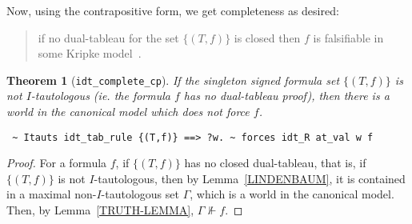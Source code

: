 \documentclass[a4paper]{article}
\newtheorem{theorem}{Theorem}
\newtheorem{definition}{Definition}
\newcommand{\hol}{\texttt{HOL4}}
\begin{document}
Now, using the contrapositive form, we get completeness as desired:
\begin{quote}
  if no dual-tableau for the set $\{(T, f)\}$ is closed then $f$ is
  falsifiable in some Kripke model~\cite{fitting-dual-tableau}.
\end{quote}

\begin{theorem}[\texttt{idt\_complete\_cp}]\label{idt-complete-cp}
  If the singleton signed formula set ${\{ (T, f) \}}$ is not
  $I$-tautologous (ie. the formula $f$ has no dual-tableau proof),
  then there is a world in the canonical model which does not force $f$.
\begin{verbatim}
 ~ Itauts idt_tab_rule {(T,f)} ==> ?w. ~ forces idt_R at_val w f
\end{verbatim}
\end{theorem}
\begin{proof}
  For a formula $f$, if $\{(T, f)\}$ has no closed dual-tableau, that is,
  if  $\{(T, f)\}$ is not $I$-tautologous, then by Lemma~\ref{LINDENBAUM}, it
  is contained in a maximal non-$I$-tautologous set $\Gamma$, which is a world 
  in the canonical model.  Then, by Lemma~\ref{TRUTH-LEMMA},
  $\Gamma \not\Vdash f$.
\end{proof}




\end{document}
